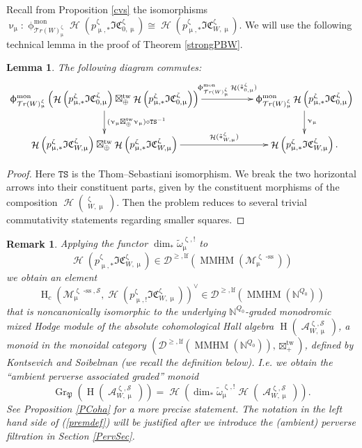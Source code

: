 \documentclass[a4paper,10pt]{amsart}
\renewcommand{\zeta}{\upzeta}
\renewcommand{\phi}{\upphi}
\renewcommand{\nu}{\upnu}
\renewcommand{\mu}{\upmu}
\newtheorem{lemma}[theorem]{Lemma}
\newtheorem{remark}[theorem]{Remark}
\DeclareMathOperator{\Pf}{\mathfrak{P}}
\newcommand{\SP}{\mathcal{S}}
\newcommand{\TS}{\mathtt{TS}}
\newcommand{\WW}{\mathcal{T}r(W)}
\newcommand{\Msp}{\mathcal{M}}
\newcommand{\ICSt}{\mathfrak{IC}}
\newcommand{\phim}[1]{\phi^{\mon}_{#1}}
\DeclareMathOperator{\sst}{-ss}
\DeclareMathOperator{\tw}{tw}
\DeclareMathOperator{\mon}{mon}
\DeclareMathOperator{\MMHM}{MMHM}
\DeclareMathOperator{\Gr}{Gr}
\DeclareMathOperator{\ms}{\tilde{\ast}}
\DeclareMathOperator{\Ho}{\mathcal{H}}
\DeclareMathOperator{\HO}{H}
\DeclareMathOperator{\Coha}{\mathcal{A}}
\newcommand{\Dulf}{\mathcal{D}^{\geq, \mathrm{lf}}}
\begin{document}
Recall from Proposition \ref{cvs} the isomorphisms $\nu_{\mu}\colon\phim{\WW^{\zeta}_{\mu}}\Ho\left(p^{\zeta}_{\mu,*}\ICSt_{0,\mu}^{\zeta}\right)\cong \Ho\left(p^{\zeta}_{\mu,*}\ICSt_{W,\mu}^{\zeta}\right)$.  We will use the following technical lemma in the proof of Theorem \ref{strongPBW}.
\begin{lemma}
\label{cohacom}
The following diagram commutes:
\[
\xymatrix{
\phim{\WW_{\mu}^{\zeta}}\left(\Ho\left(p_{\mu,*}^{\zeta}\ICSt_{0,\mu}^{\zeta}\right)\boxtimes_{\oplus}^{\tw} \Ho\left(p_{\mu,*}^{\zeta}\ICSt_{0,\mu}^{\zeta}\right)\right)\ar[rr]^-{\phim{\WW^{\zeta}_{\mu}}\Ho(\ms^{\zeta}_{0,\mu})}\ar[d]^{(\nu_{\mu}\boxtimes^{\tw}_{\oplus} \nu_{\mu})\circ \TS^{-1}} &&\phim{\WW^{\zeta}_{\mu}}\Ho\left(p^{\zeta}_{\mu,*}\ICSt_{0,\mu}^{\zeta}\right)\ar[d]^{\nu_{\mu}}\\
\Ho\left(p^{\zeta}_{\mu,*}\ICSt_{W,\mu}^{\zeta}\right)\boxtimes^{\tw}_{\oplus} \Ho\left(p^{\zeta}_{\mu,*}\ICSt_{W,\mu}^{\zeta}\right)\ar[rr]^-{\Ho(\ms^{\zeta}_{W,\mu})}&& \Ho\left(p^{\zeta}_{\mu,*}\ICSt_{W,\mu}^{\zeta}\right).
}
\]
\end{lemma}
\begin{proof}
Here $\TS$ is the Thom--Sebastiani isomorphism.  We break the two horizontal arrows into their constituent parts, given by the constituent morphisms of the composition $\Ho(\ms^{\zeta}_{W,\mu})$.  Then the problem reduces to several trivial commutativity statements regarding smaller squares.
\end{proof}
\begin{remark}
\label{absRem}
Applying the functor $\dim_* \tilde{\omega}_{\mu}^{\zeta,!}$ to 
\[
\Ho\left(p^{\zeta}_{\mu,*}\ICSt_{W,\mu}^{\zeta}\right)\in\Dulf(\MMHM(\Msp^{\zeta\sst}_{\mu}))
\]
we obtain an element 
\[
\HO_c\left(\Msp^{\zeta\sst,\SP}_{\mu},\Ho\left(p^{\zeta}_{\mu,!}\ICSt_{W,\mu}^{\zeta}\right)\right)^{\vee}\in\Dulf(\MMHM(\mathbb{N}^{Q_0}))
\]
that is noncanonically isomorphic to the underlying $\mathbb{N}^{Q_0}$-graded monodromic mixed Hodge module of the absolute cohomological Hall algebra $\HO(\Coha^{\zeta,\SP}_{W,\mu})$, a monoid in the monoidal category $(\Dulf(\MMHM(\mathbb{N}^{Q_0})),\boxtimes^{\tw}_+)$, defined by Kontsevich and Soibelman (we recall the definition below).  I.e. we obtain the ``ambient perverse associated graded'' monoid 
\begin{equation}
\label{premdef}
\Gr_{\Pf}(\HO(\Coha_{W,\mu}^{\zeta,\SP}))=\Ho\left(\dim_*\tilde{\omega}^{\zeta,!}_{\mu}\Ho\left(\Coha_{W,\mu}^{\zeta,\SP}\right)\right).
\end{equation}
See Proposition \ref {PCoha} for a more precise statement.  The notation in the left hand side of (\ref{premdef}) will be justified after we introduce the (ambient) perverse filtration in Section \ref{PervSec}.
\end{remark}
\end{document}
